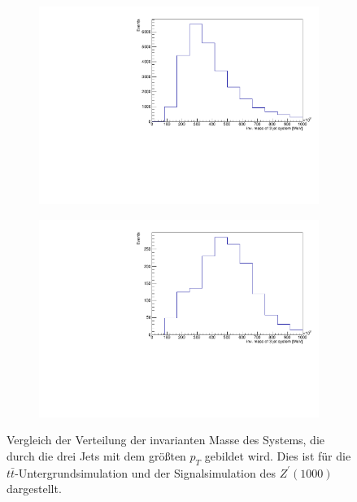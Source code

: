 \begin{figure}
  \begin{subfigure}{0.5\textwidth}
    \centering
    \includegraphics[width=\linewidth]{plots_and_txt/ttbar.mu_selected_/ttbar.mu_selected_InvJetMass.pdf}
    \caption{}
    \label{fig:ttbar_sys2}
  \end{subfigure}%
  \begin{subfigure}{0.5\textwidth}
    \centering
    \includegraphics[width=\linewidth]{plots_and_txt/zprime1000.mu_selected_/zprime1000.mu_selected_InvJetMass.pdf}
    \caption{}
    \label{fig:zprime_sys2}
  \end{subfigure}%
  \caption{Vergleich der Verteilung der invarianten Masse des Systems, die durch die drei Jets mit dem größten $p_T$ gebildet wird.
  Dies ist für die $t\bar{t}$-Untergrundsimulation  und der Signalsimulation des $Z^\prime(1000)$  dargestellt.
  }
  \label{fig:Comparison2}
\end{figure}

